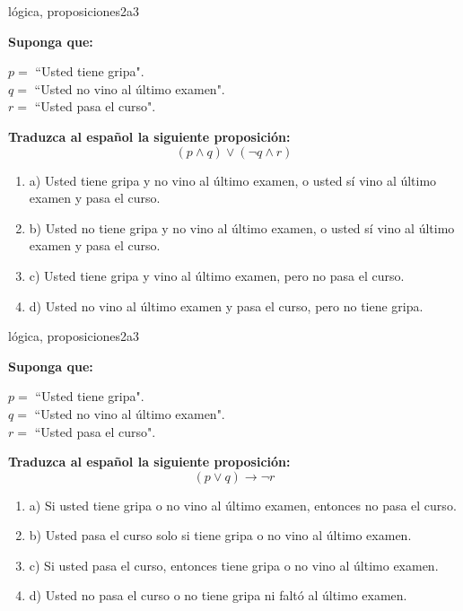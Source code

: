 \documentclass{article}
\begin{document}
\begin{question}{9}{lógica, proposiciones}{2}{a}{3}{
\textbf{Suponga que:} \smallskip

\(p = \) ``Usted tiene gripa".\\
\(q = \) ``Usted no vino al último examen".\\
\(r = \) ``Usted pasa el curso". \smallskip

\textbf{Traduzca al español la siguiente proposición:}
\[
(p \land q)\lor(\neg q \land r)
\]

\begin{enumerate}
    \item a) Usted tiene gripa y no vino al último examen, o usted sí vino al último examen y pasa el curso.
    \item b) Usted no tiene gripa y no vino al último examen, o usted sí vino al último examen y pasa el curso.
    \item c) Usted tiene gripa y vino al último examen, pero no pasa el curso.
    \item d) Usted no vino al último examen y pasa el curso, pero no tiene gripa.
\end{enumerate}
}
\end{question}

\begin{question}{10}{lógica, proposiciones}{2}{a}{3}{
\textbf{Suponga que:} \smallskip

\(p = \) ``Usted tiene gripa".\\
\(q = \) ``Usted no vino al último examen".\\
\(r = \) ``Usted pasa el curso". \smallskip

\textbf{Traduzca al español la siguiente proposición:}
\[
(p \lor q) \rightarrow \neg r
\]

\begin{enumerate}
   \item a) Si usted tiene gripa o no vino al último examen, entonces no pasa el curso.  
   \item b) Usted pasa el curso solo si tiene gripa o no vino al último examen.  
   \item c) Si usted pasa el curso, entonces tiene gripa o no vino al último examen.  
   \item d) Usted no pasa el curso o no tiene gripa ni faltó al último examen.  
\end{enumerate}
}
\end{question}
\end{document}
